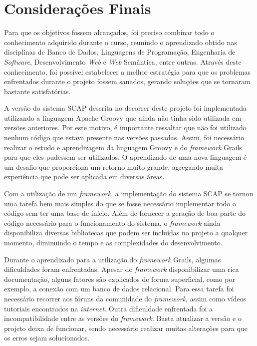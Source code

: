 \chapter{Considerações Finais}
\label{sec-conclusoes}

Para que os objetivos fossem alcançados, foi preciso combinar todo o conhecimento adquirido durante o curso, reunindo o aprendizado obtido nas disciplinas de Banco de Dados, Linguagens de Programação, Engenharia de \textit{Software}, Desenvolvimento \textit{Web} e \textit{Web} Semântica, entre outras. Através deste conhecimento, foi possível estabelecer a melhor estratégia para que os problemas enfrentados durante o projeto fossem sanados, gerando soluções que se tornaram bastante satisfatórias.  

A versão do sistema SCAP descrita no decorrer deste projeto foi implementada utilizando a linguagem Apache Groovy que ainda não tinha sido utilizada em versões anteriores. Por este motivo, é importante ressaltar que não foi utilizado nenhum código que estava presente nas versões passadas. Assim, foi necessário realizar o estudo e aprendizagem da linguagem Groovy e do \textit{framework} Grails para que eles pudessem ser utilizados. O aprendizado de uma nova linguagem é um desafio que proporciona um retorno muito grande, agregando muita experiência que pode ser aplicada em diversas áreas.

Com a utilização de um \textit{framework}, a implementação do sistema SCAP se tornou uma tarefa bem mais simples do que se fosse necessário implementar todo o código sem ter uma base de início. Além de fornecer a geração de boa parte do código necessário para o funcionamento do sistema, o \textit{framework} ainda disponibiliza diversas bibliotecas que podem ser incluídas no projeto a qualquer momento, diminuindo o tempo e as complexidades do desenvolvimento.  

Durante o aprendizado para a utilização do \textit{framework} Grails, algumas dificuldades foram enfrentadas. Apesar do \textit{framework} disponibilizar uma rica documentação, alguns fatores são explicados de forma superficial, como por exemplo, a conexão com um banco de dados relacional. Para essa tarefa foi necessário recorrer aos fóruns da comunidade do \textit{framework}, assim como vídeos tutoriais encontrados na \textit{internet}. Outra dificuldade enfrentada foi a incompatibilidade entre as versões do \textit{framework}. Basta atualizar a versão e o projeto deixa de funcionar, sendo necessário realizar muitas alterações para que os erros sejam solucionados.

